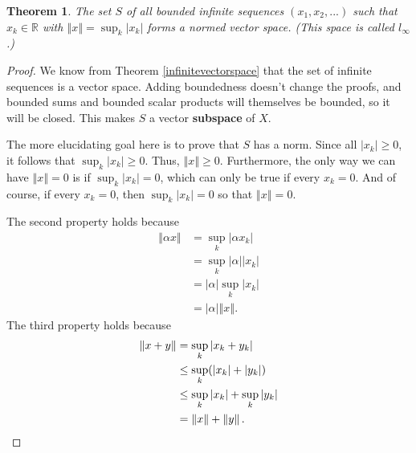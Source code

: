 \documentclass[12pt]{article}
\newcommand{\R}{\mathbb{R}}
\newcommand{\norm}[1]{\left\Vert{#1}\right\Vert}
\newcommand{\abs}[1]{\left\vert{#1}\right\vert}
\newtheorem{theorem}{Theorem}
\theoremstyle{definition}
\begin{document}
\begin{theorem}
The set $S$ of all bounded infinite sequences $(x_1, x_2, ...)$ such that $x_k \in \R$ with $\norm{x} = \sup_k \abs{x_k}$ forms a normed vector space. (This space is called $l_{\infty}$.) \label{boundednormedspace}
\end{theorem}
\begin{proof}
	We know from Theorem \ref{infinitevectorspace} that the set of infinite sequences is a vector space. Adding boundedness doesn't change the proofs, and bounded sums and bounded scalar products will themselves be bounded, so it will be closed. This makes $S$ a vector \textbf{subspace} of $X$. 
	
	The more elucidating goal here is to prove that $S$ has a norm.
Since all $\abs{x_k} \geq 0$, it follows that $\sup_k \abs{x_k} \geq 0$. Thus, $\norm{x} \geq 0$. Furthermore, the only way we can have $\norm{x}=0$ is if $\sup_k \abs{x_k}=0$, which can only be true if every $x_k=0$. And of course, if every $x_k=0$, then $\sup_k \abs{x_k}=0$ so that $\norm{x}=0$.  

The second property holds because
		\begin{align*}
			\norm{\alpha x} &= \sup_k \abs{\alpha x_k} \\
					&= \sup_k \abs{\alpha} \abs{x_k}\\
					&= \abs{\alpha} \sup_k \abs{x_k} \\
					&= \abs{\alpha} \norm{x}.
		\end{align*}
The third property holds because
		\begin{align*}
			\norm{x + y} &= \sup_k \abs{x_k + y_k}\\
				&\leq \sup_k (\abs{x_k} + \abs{y_k})\\
				&\leq \sup_k \abs{x_k} + \sup_k \abs{y_k}\\
				& = \norm{x} + \norm{y}. \qedhere
		\end{align*}
\end{proof}
\end{document}
